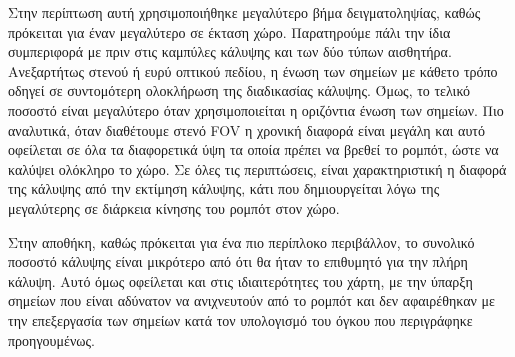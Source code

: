 Στην περίπτωση αυτή χρησιμοποιήθηκε μεγαλύτερο βήμα δειγματοληψίας, καθώς πρόκειται για έναν μεγαλύτερο σε έκταση χώρο. Παρατηρούμε πάλι την ίδια συμπεριφορά με πριν στις καμπύλες κάλυψης και των δύο τύπων αισθητήρα. Ανεξαρτήτως στενού ή ευρύ οπτικού πεδίου, η ένωση των σημείων με κάθετο τρόπο οδηγεί σε συντομότερη ολοκλήρωση της διαδικασίας κάλυψης. Όμως, το τελικό ποσοστό είναι μεγαλύτερο όταν χρησιμοποιείται η οριζόντια ένωση των σημείων. Πιο αναλυτικά, όταν διαθέτουμε στενό FOV η χρονική διαφορά είναι μεγάλη και αυτό οφείλεται σε όλα τα διαφορετικά ύψη τα οποία πρέπει να βρεθεί το ρομπότ, ώστε να καλύψει ολόκληρο το χώρο. Σε όλες τις περιπτώσεις, είναι χαρακτηριστική η διαφορά της κάλυψης από την εκτίμηση κάλυψης, κάτι που δημιουργείται λόγω της μεγαλύτερης σε διάρκεια κίνησης του ρομπότ στον χώρο.

Στην αποθήκη, καθώς πρόκειται για ένα πιο περίπλοκο περιβάλλον, το συνολικό ποσοστό κάλυψης είναι μικρότερο από ότι θα ήταν το επιθυμητό για την πλήρη κάλυψη. Αυτό όμως οφείλεται και στις ιδιαιτερότητες του χάρτη, με την ύπαρξη σημείων που είναι αδύνατον να ανιχνευτούν από το ρομπότ και δεν αφαιρέθηκαν με την επεξεργασία των σημείων κατά τον υπολογισμό του όγκου που περιγράφηκε προηγουμένως.